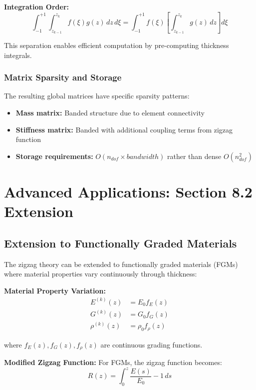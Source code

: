 \documentclass[12pt,a4paper]{article}
\begin{document}
\textbf{Integration Order:}
\begin{equation}
\int_{-1}^{+1}\int_{z_{k-1}}^{z_k} f(\xi)g(z) \, dz \, d\xi = \int_{-1}^{+1}f(\xi) \left[\int_{z_{k-1}}^{z_k} g(z) \, dz\right] d\xi
\end{equation}

This separation enables efficient computation by pre-computing thickness integrals.

\subsubsection{Matrix Sparsity and Storage}

The resulting global matrices have specific sparsity patterns:

\begin{itemize}
\item \textbf{Mass matrix:} Banded structure due to element connectivity
\item \textbf{Stiffness matrix:} Banded with additional coupling terms from zigzag function
\item \textbf{Storage requirements:} $O(n_{dof} \times bandwidth)$ rather than dense $O(n_{dof}^2)$
\end{itemize}

\section{Advanced Applications: Section 8.2 Extension}

\subsection{Extension to Functionally Graded Materials}

The zigzag theory can be extended to functionally graded materials (FGMs) where material properties vary continuously through thickness:

\textbf{Material Property Variation:}
\begin{align}
E^{(k)}(z) &= E_0 f_E(z) \\
G^{(k)}(z) &= G_0 f_G(z) \\
\rho^{(k)}(z) &= \rho_0 f_\rho(z)
\end{align}

where $f_E(z), f_G(z), f_\rho(z)$ are continuous grading functions.

\textbf{Modified Zigzag Function:} For FGMs, the zigzag function becomes:
\begin{equation}
R(z) = \int_0^z \frac{E(s)}{E_0} - 1 \, ds
\end{equation}
\end{document}
